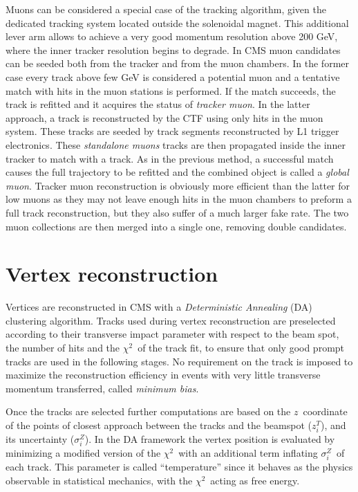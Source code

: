 Muons can be considered a special case of the tracking algorithm, given the dedicated tracking system located outside the solenoidal magnet. This additional lever arm allows to achieve a very good momentum resolution above 200 GeV, where the inner tracker resolution begins to degrade. In CMS muon candidates can be seeded both from the tracker and from the muon chambers. In the former case every track above few GeV is considered a potential muon and a tentative match with hits in the muon stations is performed. If the match succeeds, the track is refitted and it acquires the status of \emph{tracker muon}. In the latter approach, a track is reconstructed by the CTF using only hits in the muon system. These tracks are seeded by track segments reconstructed by L1 trigger electronics. These \emph{standalone muons} tracks are then propagated inside the inner tracker to match with a track. As in the previous method, a successful match causes the full trajectory to be refitted and the combined object is called a \emph{global muon}. Tracker muon reconstruction is obviously more efficient than the latter for low \pT muons as they may not leave enough hits in the muon chambers to preform a full track reconstruction, but they also suffer of a much larger fake rate. The two muon collections are then merged into a single one, removing double candidates.

\section{Vertex reconstruction}

Vertices are reconstructed in CMS with a \emph{Deterministic Annealing} (DA) \cite{IEEE_DetAnnealing} clustering algorithm. Tracks used during vertex reconstruction are preselected according to their transverse impact parameter with respect to the beam spot, the number of hits and the $\chi^2$\ of the track fit, to ensure that only good prompt tracks are used in the following stages. No requirement on the track \pT is imposed to maximize the reconstruction efficiency in events with very little transverse momentum transferred, called \emph{minimum bias}.

Once the tracks are selected further computations are based on the $z$\ coordinate of the points of closest approach between the tracks and the beamspot ($z_i^T$), and its uncertainty ($\sigma_i^Z$). In the DA framework the vertex position is evaluated by minimizing a modified version of the $\chi^2$\ with an additional term inflating $\sigma_i^Z$\ of each track. This parameter is called ``temperature'' since it behaves as the physics observable in statistical mechanics, with the  $\chi^2$\ acting as free energy.

